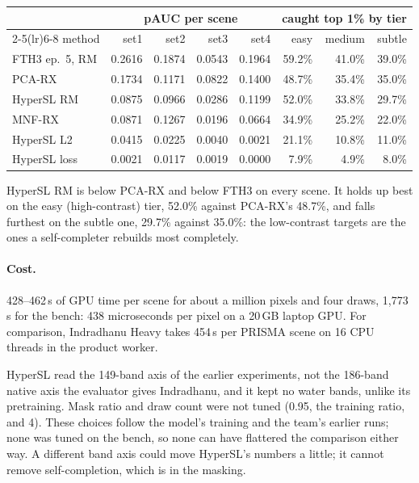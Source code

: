 \begin{center}\small
\begin{tabular}{@{}lrrrrrrr@{}}
\toprule
& \multicolumn{4}{c}{pAUC per scene} & \multicolumn{3}{c}{caught top 1\% by tier} \\
\cmidrule(lr){2-5}\cmidrule(lr){6-8}
method & set1 & set2 & set3 & set4 & easy & medium & subtle \\
\midrule
FTH3 ep.\ 5, RM & 0.2616 & 0.1874 & 0.0543 & 0.1964 & 59.2\% & 41.0\% & 39.0\% \\
PCA-RX & 0.1734 & 0.1171 & 0.0822 & 0.1400 & 48.7\% & 35.4\% & 35.0\% \\
HyperSL RM & 0.0875 & 0.0966 & 0.0286 & 0.1199 & 52.0\% & 33.8\% & 29.7\% \\
MNF-RX & 0.0871 & 0.1267 & 0.0196 & 0.0664 & 34.9\% & 25.2\% & 22.0\% \\
HyperSL L2 & 0.0415 & 0.0225 & 0.0040 & 0.0021 & 21.1\% & 10.8\% & 11.0\% \\
HyperSL loss & 0.0021 & 0.0117 & 0.0019 & 0.0000 & 7.9\% & 4.9\% & 8.0\% \\
\bottomrule
\end{tabular}
\end{center}
HyperSL RM is below PCA-RX and below FTH3 on every scene. It holds up best on the easy (high-contrast) tier, 52.0\% against PCA-RX's 48.7\%, and falls furthest on the
subtle one, 29.7\% against 35.0\%: the low-contrast targets are the ones a self-completer rebuilds most
completely.

\paragraph{Cost.} 428--462\,s of GPU time per scene for about a million pixels and four draws, 1,773\,s for the bench: 438
microseconds per pixel on a 20\,GB laptop GPU\tagC. For comparison, Indradhanu Heavy takes 454\,s per PRISMA scene on 16
CPU threads in the product worker\tbrk{}.

\begin{sourcenote}
HyperSL read the 149-band axis of the earlier experiments, not the 186-band native axis the evaluator gives Indradhanu,
and it kept no water bands, unlike its pretraining. Mask ratio and draw count were not tuned (0.95, the training ratio,
and 4). These choices follow the model's training and the team's earlier runs; none was tuned on the bench, so none can
have flattered the comparison either way. A different band axis could move HyperSL's numbers a little; it cannot remove
self-completion, which is in the masking.
\end{sourcenote}

